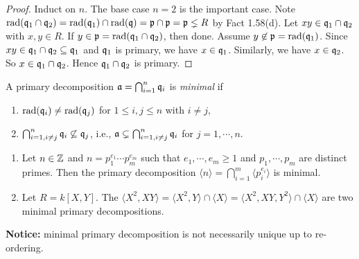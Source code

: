 \begin{proof}
    Induct on $n$. The base case $n = 2$ is the important case. Note $\operatorname{rad}(\mathfrak{q}_1 \cap \mathfrak{q}_2) = \operatorname{rad}(\mathfrak{q}_1) \cap \operatorname{rad}(\mathfrak{q}) = \mathfrak{p} \cap \mathfrak{p} = \mathfrak{p} \lneq R$ by Fact 1.58(d). Let $xy \in \mathfrak{q}_1 \cap \mathfrak{q}_2$ with $x,y \in R$. If $y \in \mathfrak{p} = \operatorname{rad}(\mathfrak{q}_1 \cap \mathfrak{q}_2)$, then done. Assume $y \not \in \mathfrak{p} = \operatorname{rad}(\mathfrak{q}_1)$. Since $xy \in \mathfrak{q}_1 \cap \mathfrak{q}_2 \subseteq \mathfrak{q}_1$ and $\mathfrak{q}_1$ is primary, we have $x \in \mathfrak{q}_1$. Similarly, we have $x \in \mathfrak{q}_2$. So $x \in \mathfrak{q}_1 \cap \mathfrak{q}_2$. Hence $\mathfrak{q}_1 \cap \mathfrak{q}_2$ is primary.
\end{proof}

\begin{definition}
    A primary decomposition $\mathfrak{a} = \bigcap_{i=1}^{n}\mathfrak{q}_i$ is \emph{minimal} if 
    \begin{enumerate}
        \item $\operatorname{rad}(\mathfrak{q}_i) \neq \operatorname{rad}(\mathfrak{q}_j)$ for $1 \leq i,j \leq n$ with $i \neq j$,
        \item $\bigcap_{i=1,i \neq j}^{n} \mathfrak{q}_i \not \subseteq \mathfrak{q}_j$, i.e., $\mathfrak{a} \subsetneq \bigcap_{i=1, i \neq j}^{n} \mathfrak{q}_i$ for $j = 1,\cdots,n$.
    \end{enumerate}
\end{definition}

\begin{example}
    \begin{enumerate}
        \item 
            Let $n \in \mathbb{Z}$ and $n = p_1^{e_1} \cdots p_m^{e_m}$ such that $e_1,\cdots,e_m \geq 1$ and $p_1,\cdots,p_m$ are distinct primes. Then the primary decomposition $\langle n \rangle = \bigcap_{i=1}^{m} \langle p_i^{e_i} \rangle$ is minimal.
        \item Let $R = k[X,Y]$. The $\langle X^{2},XY \rangle = \langle X^{2},Y \rangle \cap \langle X \rangle = \langle X^{2},XY,Y^{2} \rangle \cap \langle X \rangle$ are two minimal primary decompositions.
    \end{enumerate}
\end{example}

\noindent \textbf{Notice:} minimal primary decomposition is not necessarily unique up to re-ordering.

